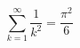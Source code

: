 \documentclass{ltjsarticle}
\begin{document}
\[ \sum_{k=1}^{\infty} \frac{1}{k^2} = \frac{\pi^2}{6} \]
\end{document}
